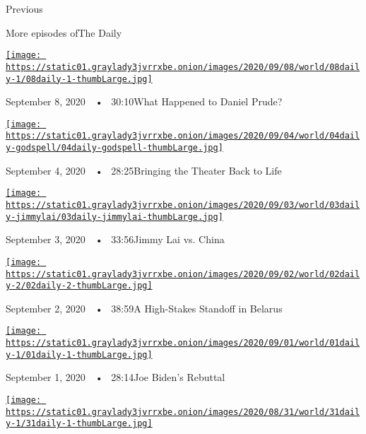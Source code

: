 Previous

More episodes ofThe Daily

\href{https://www.nytimes3xbfgragh.onion/2020/09/08/podcasts/the-daily/Daniel-Prude-BLM-police.html?action=click\&module=audio-series-bar\&region=header\&pgtype=Article}{\texttt{[image: https://static01.graylady3jvrrxbe.onion/images/2020/09/08/world/08daily-1/08daily-1-thumbLarge.jpg]}}

September 8, 2020~~•~ 30:10What Happened to Daniel Prude?

\href{https://www.nytimes3xbfgragh.onion/2020/09/04/podcasts/the-daily/Godspell-theater-coronavirus.html?action=click\&module=audio-series-bar\&region=header\&pgtype=Article}{\texttt{[image: https://static01.graylady3jvrrxbe.onion/images/2020/09/04/world/04daily-godspell/04daily-godspell-thumbLarge.jpg]}}

September 4, 2020~~•~ 28:25Bringing the Theater Back to Life

\href{https://www.nytimes3xbfgragh.onion/2020/09/03/podcasts/the-daily/hong-kong-china-jimmy-lai.html?action=click\&module=audio-series-bar\&region=header\&pgtype=Article}{\texttt{[image: https://static01.graylady3jvrrxbe.onion/images/2020/09/03/world/03daily-jimmylai/03daily-jimmylai-thumbLarge.jpg]}}

September 3, 2020~~•~ 33:56Jimmy Lai vs. China

\href{https://www.nytimes3xbfgragh.onion/2020/09/02/podcasts/the-daily/belarus-protests-lukashenko.html?action=click\&module=audio-series-bar\&region=header\&pgtype=Article}{\texttt{[image: https://static01.graylady3jvrrxbe.onion/images/2020/09/02/world/02daily-2/02daily-2-thumbLarge.jpg]}}

September 2, 2020~~•~ 38:59A High-Stakes Standoff in Belarus

\href{https://www.nytimes3xbfgragh.onion/2020/09/01/podcasts/the-daily/joe-biden-protests-trump.html?action=click\&module=audio-series-bar\&region=header\&pgtype=Article}{\texttt{[image: https://static01.graylady3jvrrxbe.onion/images/2020/09/01/world/01daily-1/01daily-1-thumbLarge.jpg]}}

September 1, 2020~~•~ 28:14Joe Biden's Rebuttal

\href{https://www.nytimes3xbfgragh.onion/2020/08/31/podcasts/the-daily/flint-michigan-police-officer.html?action=click\&module=audio-series-bar\&region=header\&pgtype=Article}{\texttt{[image: https://static01.graylady3jvrrxbe.onion/images/2020/08/31/world/31daily-1/31daily-1-thumbLarge.jpg]}}

